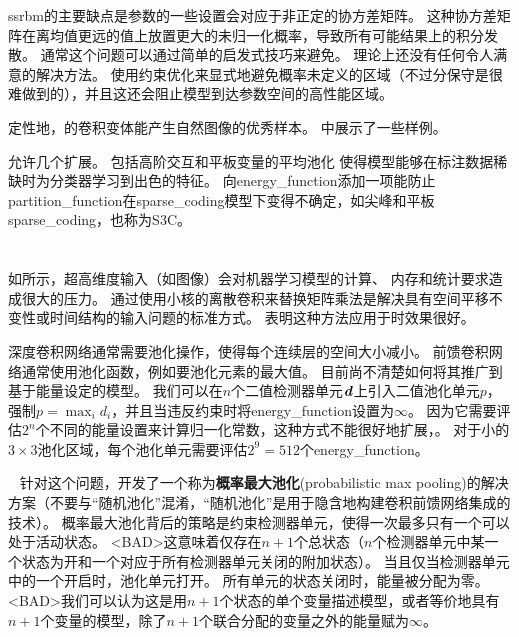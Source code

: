 \gls{ssrbm}的主要缺点是参数的一些设置会对应于非正定的协方差矩阵。
这种协方差矩阵在离均值更远的值上放置更大的未归一化概率，导致所有可能结果上的积分发散。
通常这个问题可以通过简单的启发式技巧来避免。
理论上还没有任何令人满意的解决方法。
使用约束优化来显式地避免概率未定义的区域（不过分保守是很难做到的），并且这还会阻止模型到达参数空间的高性能区域。

定性地，的卷积变体能产生自然图像的优秀样本。
中展示了一些样例。

允许几个扩展。
包括高阶交互和平板变量的平均池化\citep{courville-al-ieee14} 使得模型能够在标注数据稀缺时为分类器学习到出色的特征。
向\gls{energy_function}添加一项能防止\gls{partition_function}在\gls{sparse_coding}模型下变得不确定，如尖峰和平板\gls{sparse_coding}\citep{Goodfeli-et-al-TPAMI-Deep-PrePrint-2013}，也称为S3C。


\section{}
\label{sec:convolutional_boltzmann_machines}

如所示，超高维度输入（如图像）会对机器学习模型的计算、 内存和统计要求造成很大的压力。
通过使用小核的离散卷积来替换矩阵乘法是解决具有空间平移不变性或时间结构的输入问题的标准方式。
\citet{Desjardins-2008} 表明这种方法应用于时效果很好。

深度卷积网络通常需要池化操作，使得每个连续层的空间大小减小。
前馈卷积网络通常使用池化函数，例如要池化元素的最大值。
目前尚不清楚如何将其推广到基于能量设定的模型。
我们可以在$n$个二值检测器单元$\boldsymbol{\mathit{d}}$上引入二值池化单元$p$，强制$p = \max_i d_i$，并且当违反约束时将\gls{energy_function}设置为$\infty$。
因为它需要评估$2^n$个不同的能量设置来计算归一化常数，这种方式不能很好地扩展，。
对于小的$3\times3$池化区域，每个池化单元需要评估$2^9 = 512$个\gls{energy_function}。


~\citet{HonglakL2009} 针对这个问题，开发了一个称为\textbf{概率最大池化}(probabilistic max pooling)的解决方案（不要与``随机池化''混淆，``随机池化''是用于隐含地构建卷积前馈网络集成的技术）。
概率最大池化背后的策略是约束检测器单元，使得一次最多只有一个可以处于活动状态。
<BAD>这意味着仅存在$n + 1$个总状态（$n$个检测器单元中某一个状态为开和一个对应于所有检测器单元关闭的附加状态）。
当且仅当检测器单元中的一个开启时，池化单元打开。
所有单元的状态关闭时，能量被分配为零。
<BAD>我们可以认为这是用$n + 1$个状态的单个变量描述模型，或者等价地具有$n + 1$个变量的模型，除了$n+1$个联合分配的变量之外的能量赋为$\infty$。


